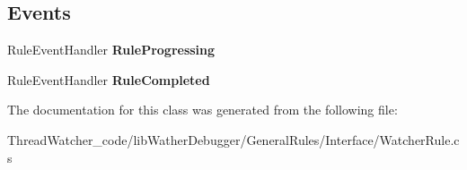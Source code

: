 \subsection*{Events}
\begin{DoxyCompactItemize}
\item 
\hypertarget{class_watcher_1_1_debugger_1_1_watcher_rule_a606e7c911911b6f60678ccbb7c70eb86}{Rule\+Event\+Handler {\bfseries Rule\+Progressing}}\label{class_watcher_1_1_debugger_1_1_watcher_rule_a606e7c911911b6f60678ccbb7c70eb86}

\item 
\hypertarget{class_watcher_1_1_debugger_1_1_watcher_rule_acd7d4373329fe882e91876c0f91f9b20}{Rule\+Event\+Handler {\bfseries Rule\+Completed}}\label{class_watcher_1_1_debugger_1_1_watcher_rule_acd7d4373329fe882e91876c0f91f9b20}

\end{DoxyCompactItemize}


The documentation for this class was generated from the following file\+:\begin{DoxyCompactItemize}
\item 
Thread\+Watcher\+\_\+code/lib\+Wather\+Debugger/\+General\+Rules/\+Interface/Watcher\+Rule.\+cs\end{DoxyCompactItemize}

